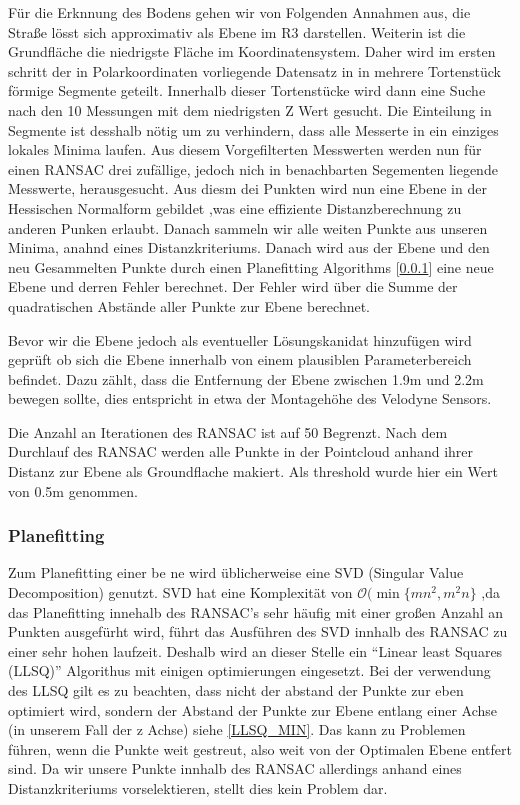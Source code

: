 \documentclass[11pt,oneside,openright]{mpreport}
\begin{document}
Für die Erknnung des Bodens gehen wir von Folgenden Annahmen aus, die Straße lösst sich approximativ als Ebene im R3 darstellen. Weiterin ist die Grundfläche die niedrigste
Fläche im Koordinatensystem. Daher wird im ersten schritt der in Polarkoordinaten vorliegende Datensatz in  in mehrere Tortenstück förmige Segmente geteilt.
Innerhalb dieser Tortenstücke wird dann eine Suche nach den 10 Messungen mit dem niedrigsten Z Wert gesucht. Die Einteilung in Segmente ist desshalb nötig
um zu verhindern, dass alle Messerte in ein einziges lokales Minima laufen. Aus diesem Vorgefilterten Messwerten werden nun für einen RANSAC drei zufällige,
jedoch nich in benachbarten Segementen liegende Messwerte, herausgesucht. Aus diesm dei Punkten wird nun eine Ebene in der Hessischen Normalform gebildet
,was eine effiziente Distanzberechnung zu anderen Punken erlaubt. Danach sammeln wir alle weiten Punkte aus unseren Minima, anahnd eines Distanzkriteriums.
Danach wird aus der Ebene und den neu Gesammelten Punkte durch einen Planefitting Algorithms [\cref{subssec:planefitting}] eine neue Ebene und derren Fehler berechnet.
Der Fehler wird über die Summe der quadratischen Abstände aller Punkte zur Ebene berechnet.

Bevor wir die Ebene jedoch als eventueller Lösungskanidat hinzufügen wird geprüft ob sich die Ebene innerhalb von einem plausiblen Parameterbereich befindet.
Dazu zählt, dass die Entfernung der Ebene zwischen 1.9m und 2.2m bewegen sollte, dies entspricht in etwa der Montagehöhe des Velodyne Sensors.

Die Anzahl an Iterationen des RANSAC ist auf 50 Begrenzt. Nach dem Durchlauf des RANSAC werden alle Punkte in der Pointcloud anhand ihrer Distanz zur Ebene als
Groundflache makiert. Als threshold wurde hier ein Wert von 0.5m genommen.


\subsubsection{Planefitting}
\label{subssec:planefitting}
Zum Planefitting einer be ne wird üblicherweise eine SVD (Singular Value Decomposition) genutzt. SVD hat eine Komplexität von $\mathcal{O}(\min\{mn^2, m^2n\}$ \cite{Holmes2007},da das Planefitting innehalb 
des RANSAC's sehr häufig mit einer großen Anzahl an Punkten ausgefürht wird, führt das Ausführen des SVD innhalb des RANSAC zu einer sehr hohen laufzeit.
Deshalb wird an dieser Stelle ein ``Linear least Squares (LLSQ)'' Algorithus mit einigen optimierungen eingesetzt. Bei der verwendung des LLSQ gilt es zu beachten,
dass nicht der abstand der Punkte zur eben optimiert wird, sondern der Abstand der Punkte zur Ebene entlang einer Achse (in unserem Fall der z Achse) siehe \cref{LLSQ_MIN}.
Das kann zu Problemen führen, wenn die Punkte weit gestreut, also weit von der Optimalen Ebene entfert sind. Da wir unsere Punkte innhalb des RANSAC allerdings anhand eines 
Distanzkriteriums vorselektieren, stellt dies kein Problem dar.
\end{document}
